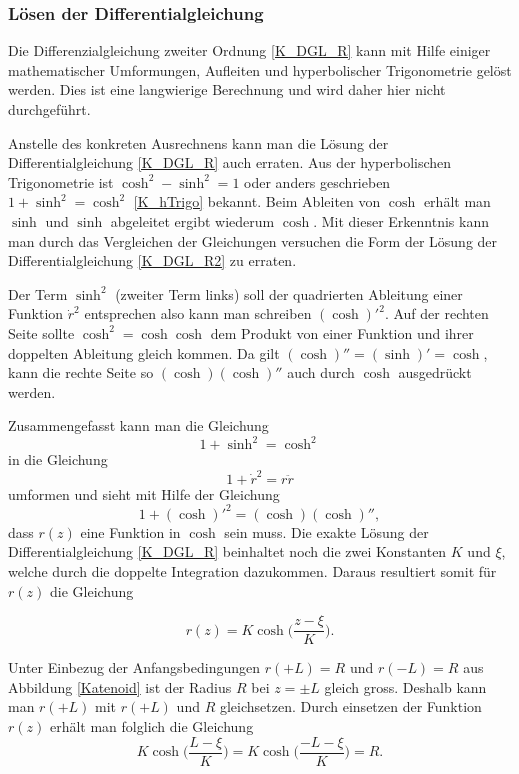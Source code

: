 \begin{refsection}
\subsubsection{Lösen der Differentialgleichung}
Die Differenzialgleichung zweiter Ordnung \eqref{K_DGL_R} kann mit Hilfe einiger mathematischer Umformungen, Aufleiten und hyperbolischer Trigonometrie gelöst werden. 
Dies ist eine langwierige Berechnung und wird daher hier nicht durchgeführt.

Anstelle des konkreten Ausrechnens kann man die Lösung der Differentialgleichung \eqref{K_DGL_R} auch erraten. 
Aus der hyperbolischen Trigonometrie ist $\cosh^2-\sinh^2=1$ oder anders geschrieben $1+\sinh^2=\cosh^2$ \eqref{K_hTrigo} bekannt. 
Beim Ableiten von $\cosh$ erhält man $\sinh$ und $\sinh$ abgeleitet ergibt wiederum $\cosh$. 
Mit dieser Erkenntnis kann man durch das Vergleichen der Gleichungen versuchen die Form der Lösung der Differentialgleichung \eqref{K_DGL_R2} zu erraten. 

Der Term $\sinh^2$  (zweiter Term links) soll der quadrierten Ableitung einer Funktion ${\dot {r}}^2$ entsprechen also kann man schreiben $(\cosh)'^2$. 
Auf der rechten Seite sollte $\cosh^2=\cosh \cosh$ dem Produkt von einer Funktion und ihrer doppelten Ableitung gleich kommen. Da gilt $(\cosh)''=(\sinh)'=\cosh$, kann die rechte Seite so $(\cosh) (\cosh)''$ auch durch $\cosh$ ausgedrückt werden.


Zusammengefasst kann man die Gleichung 
\begin{equation} \label{K_hTrigo}
1+\sinh^2=\cosh^2
\end{equation}
 in die Gleichung 
 \begin{equation} \label{K_DGL_R2}
1+{\dot {r}}^2=r  \ddot{r}
\end{equation}
 umformen und sieht mit Hilfe der Gleichung 
\begin{equation} \label{K_hTrigoU}
1+(\cosh)'^2=(\cosh) (\cosh)'' ,
\end{equation}
dass $r(z)$ eine Funktion in $\cosh$ sein muss.
Die exakte Lösung der Differentialgleichung \eqref{K_DGL_R} beinhaltet noch die zwei Konstanten $K$ und $\xi$, welche durch die doppelte Integration dazukommen. Daraus resultiert somit für $r(z)$ die Gleichung 

\begin{equation} \label{K_r}
r(z)=K \cosh\bigg(\frac{z-\xi}{K}\bigg) .
\end{equation}

Unter Einbezug der Anfangsbedingungen $r(+L)=R$ und $r(-L)=R$ aus Abbildung \ref{Katenoid} ist der Radius $R$ bei $z= \pm L$ gleich gross. Deshalb kann man $r(+L)$ mit $r(+L)$ und $R$ gleichsetzen. Durch einsetzen der Funktion $r(z)$ erhält man folglich die Gleichung
\begin{equation} \label{K_rL}
K \cosh\bigg(\frac{L-\xi}{K}\bigg)=K \cosh\bigg(\frac{-L-\xi}{K}\bigg)=R .
\end{equation}


\end{refsection}
